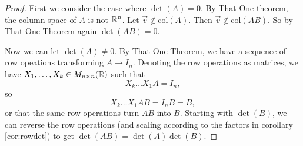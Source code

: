 \begin{proof}
	First we consider the case where $\det (A)=0$. By That One theorem, the column space of $A$ is not $\mathbb{R}^n$. Let $\vec{v}\notin \textrm{col}(A)$. Then $\vec{v}\notin \textrm{col} (AB)$. So by That One Theorem again $\det (AB)=0$.
	
	Now we can let $\det (A)\neq 0$. By That One Theorem, we have a sequence of row opeations transforming $A\to I_n$. Denoting the row operations as matrices, we have $X_1,\ldots,X_k\in M_{n\times n}(\mathbb{R})$ such that\[
	X_k \ldots X_1A=I_n,
	\]
	so \[
		X_k \ldots X_1AB =I_nB=B,
	\]
	or that the same row operations turn $AB$ into $B$. Starting with $\det (B)$, we can reverse the row operations (and scaling according to the factors in corollary \ref{cor:rowdet}) to get $\det(AB)=\det(A)\det(B)$.
\end{proof}
\exercises
